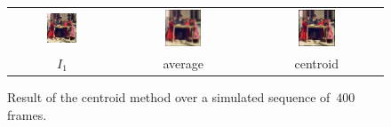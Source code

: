 \documentclass{ipol}
\begin{document}
\begin{figure}[p]
	\begin{center}
		\begin{tabular}{ccc}
			\includegraphics[width=0.3\textwidth]{f/sim_first.png} &
			\includegraphics[width=0.3\textwidth]{f/sim_avg.png} &
			\includegraphics[width=0.3\textwidth]{f/sim_centroid.png} \\
			$I_1$ & average & centroid \\
		\end{tabular}
	\end{center}
	\caption{Result of the centroid method over a simulated sequence of~$400$
	frames.}
	\label{fig:expsim}
\end{figure}
\end{document}

